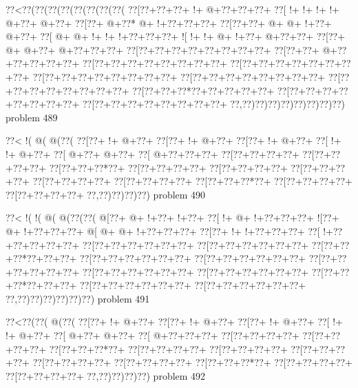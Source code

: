 \vbox{\vbox{\goo
\0??<\0??(\0??(\0??(\0??(\0??(\0??(\0??(\0??(
\0??[\0??+\0??+\0??+\- !+\- @+\0??+\0??+\0??+
\0??[\- !+\- !+\- !+\- !+\- @+\0??+\- @+\0??+
\0??[\0??+\- @+\0??*\- @+\- !+\0??+\0??+\0??+
\0??[\0??+\0??+\- @+\- @+\- !+\0??+\- @+\0??+
\0??[\- @+\- @+\- !+\- !+\- !+\0??+\0??+\0??+
\- ![\- !+\- !+\- @+\- !+\0??+\- @+\0??+\0??+
\0??[\0??+\- @+\- @+\0??+\- @+\0??+\0??+\0??+
\0??[\0??+\0??+\0??+\0??+\0??+\0??+\0??+\0??+
\0??[\0??+\0??+\- @+\0??+\0??+\0??+\0??+\0??+
\0??[\0??+\0??+\0??+\0??+\0??+\0??+\0??+\0??+
\0??[\0??+\0??+\0??+\0??+\0??+\0??+\0??+\0??+
\0??[\0??+\0??+\0??+\0??+\0??+\0??+\0??+\0??+
\0??[\0??+\0??+\0??+\0??+\0??+\0??+\0??+\0??+
\0??[\0??+\0??+\0??+\0??+\0??+\0??+\0??+\0??+
\0??[\0??+\0??+\0??*\0??+\0??+\0??+\0??+\0??+
\0??[\0??+\0??+\0??+\0??+\0??+\0??+\0??+\0??+
\0??[\0??+\0??+\0??+\0??+\0??+\0??+\0??+\0??+
\0??,\0??)\0??)\0??)\0??)\0??)\0??)\0??)\0??)
}
\hfil problem 489\hfil\break
}

\vbox{\vbox{\goo
\0??<\- !(\- @(\- @(\0??(
\0??[\0??+\- !+\- @+\0??+
\0??[\0??+\- !+\- @+\0??+
\0??[\0??+\- !+\- @+\0??+
\0??[\- !+\- !+\- @+\0??+
\0??[\- @+\0??+\- @+\0??+
\0??[\- @+\0??+\0??+\0??+
\0??[\0??+\0??+\0??+\0??+
\0??[\0??+\0??+\0??+\0??+
\0??[\0??+\0??+\0??*\0??+
\0??[\0??+\0??+\0??+\0??+
\0??[\0??+\0??+\0??+\0??+
\0??[\0??+\0??+\0??+\0??+
\0??[\0??+\0??+\0??+\0??+
\0??[\0??+\0??+\0??+\0??+
\0??[\0??+\0??+\0??*\0??+
\0??[\0??+\0??+\0??+\0??+
\0??[\0??+\0??+\0??+\0??+
\0??,\0??)\0??)\0??)\0??)
}
\hfil problem 490\hfil\break
}

\vbox{\vbox{\goo
\0??<\- !(\- !(\- @(\- @(\0??(\0??(
\- @[\0??+\- @+\- !+\0??+\- !+\0??+
\0??[\- !+\- @+\- !+\0??+\0??+\0??+
\- ![\0??+\- @+\- !+\0??+\0??+\0??+
\- @[\- @+\- @+\- !+\0??+\0??+\0??+
\0??[\0??+\- !+\- !+\0??+\0??+\0??+
\0??[\- !+\0??+\0??+\0??+\0??+\0??+
\0??[\0??+\0??+\0??+\0??+\0??+\0??+
\0??[\0??+\0??+\0??+\0??+\0??+\0??+
\0??[\0??+\0??+\0??*\0??+\0??+\0??+
\0??[\0??+\0??+\0??+\0??+\0??+\0??+
\0??[\0??+\0??+\0??+\0??+\0??+\0??+
\0??[\0??+\0??+\0??+\0??+\0??+\0??+
\0??[\0??+\0??+\0??+\0??+\0??+\0??+
\0??[\0??+\0??+\0??+\0??+\0??+\0??+
\0??[\0??+\0??+\0??*\0??+\0??+\0??+
\0??[\0??+\0??+\0??+\0??+\0??+\0??+
\0??[\0??+\0??+\0??+\0??+\0??+\0??+
\0??,\0??)\0??)\0??)\0??)\0??)\0??)
}
\hfil problem 491\hfil\break
}

\vbox{\vbox{\goo
\0??<\0??(\0??(\- @(\0??(
\0??[\0??+\- !+\- @+\0??+
\0??[\0??+\- !+\- @+\0??+
\0??[\0??+\- !+\- @+\0??+
\0??[\- !+\- !+\- @+\0??+
\0??[\- @+\0??+\- @+\0??+
\0??[\- @+\0??+\0??+\0??+
\0??[\0??+\0??+\0??+\0??+
\0??[\0??+\0??+\0??+\0??+
\0??[\0??+\0??+\0??*\0??+
\0??[\0??+\0??+\0??+\0??+
\0??[\0??+\0??+\0??+\0??+
\0??[\0??+\0??+\0??+\0??+
\0??[\0??+\0??+\0??+\0??+
\0??[\0??+\0??+\0??+\0??+
\0??[\0??+\0??+\0??*\0??+
\0??[\0??+\0??+\0??+\0??+
\0??[\0??+\0??+\0??+\0??+
\0??,\0??)\0??)\0??)\0??)
}
\hfil problem 492\hfil\break
}

